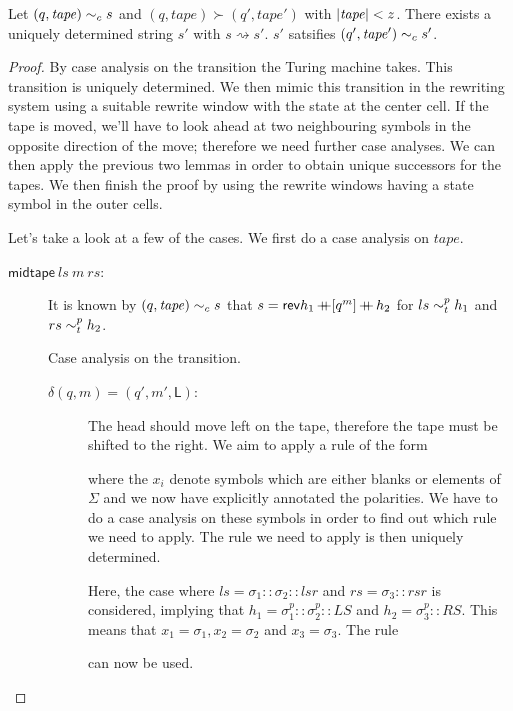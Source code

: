\documentclass[a4paper,UKenglish,cleveref, autoref]{lipics-v2019}
\newcommand{\strent}{\rightsquigarrow}
\begin{document}
\begin{lemma}\label{lem:simstep}
  Let $(q, \mathit{tape}) \sim_c{} s$ and $(q, \mathit{tape}) \succ (q', \mathit{tape}')$ with $|\mathit{tape}| < z$. There exists a uniquely determined string $s'$ with $s \strent{} s'$. $s'$ satsifies $(q', \mathit{tape}') \sim_c{} s'$. 
\end{lemma}
\begin{proof}
  By case analysis on the transition the Turing machine takes. This transition is uniquely determined. We then mimic this transition in the rewriting system using a suitable rewrite window with the state at the center cell. If the tape is moved, we'll have to look ahead at two neighbouring symbols in the opposite direction of the move; therefore we need further case analyses. We can then apply the previous two lemmas in order to obtain unique successors for the tapes. 
  We then finish the proof by using the rewrite windows having a state symbol in the outer cells. 

  Let's take a look at a few of the cases.
  We first do a case analysis on $\mathit{tape}$.
  \begin{description}
    \item[$\textsf{midtape}~ls~m~rs$:]
      It is known by $(q, \mathit{tape}) \sim_c{} s$ that $s = \mathsf{rev}{h_1} \mathop{{+}\!\!\!{+}} [q^m] \mathop{{+}\!\!\!{+}} h_2$ for $ls \sim_t^{p} h_1$ and $rs \sim_t^{p} h_2$.

      Case analysis on the transition.
      \begin{description}
        \item[$\delta(q, m) = (q', m', \textsf{L})$:]
          The head should move left on the tape, therefore the tape must be shifted to the right. We aim to apply a rule of the form
          \begin{center}
          \end{center}
          where the $x_i$ denote symbols which are either blanks or elements of $\Sigma$ and we now have explicitly annotated the polarities. We have to do a case analysis on these symbols in order to find out which rule we need to apply. 
          The rule we need to apply is then uniquely determined. 

          Here, the case where $ls = \sigma_1 :: \sigma_2 :: lsr$ and $rs = \sigma_3 :: rsr$ is considered, implying that $h_1 = \sigma_1^p :: \sigma_2^p :: LS$ and $h_2 = \sigma_3^p :: RS$. 
          This means that $x_1 = \sigma_1, x_2 = \sigma_2$ and $x_3 = \sigma_3$. The rule 
          \begin{center}
          \end{center}
          can now be used.


\end{description}
\end{description}
\end{proof}
\end{document}

